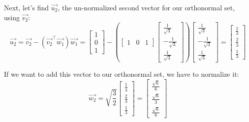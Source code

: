 \begin{enumerate}
{    Next, let's find $\vec{u_2}$, the un-normalized second vector for our orthonormal set, using $\vec{v_2}$:
    \[\vec{u_2} = \vec{v_2} - (\vec{v_2}^{\top}\vec{w_1})\vec{w_1} = \begin{bmatrix}1\\0\\1\end{bmatrix} - (\begin{bmatrix}1 & 0 & 1\end{bmatrix}\begin{bmatrix}\frac{1}{\sqrt{3}}\\-\frac{1}{\sqrt{3}}\\\frac{1}{\sqrt{3}}\end{bmatrix})\begin{bmatrix}\frac{1}{\sqrt{3}}\\-\frac{1}{\sqrt{3}}\\\frac{1}{\sqrt{3}}\end{bmatrix} = \begin{bmatrix}\frac{1}{3}\\\frac{2}{3}\\\frac{1}{3}\end{bmatrix} \]

    If we want to add this vector to our orthonormal set, we have to normalize it:
    \[\vec{w_2} = \sqrt{\frac{3}{2}}\begin{bmatrix}\frac{1}{3}\\\frac{2}{3}\\\frac{1}{3}\end{bmatrix} = \begin{bmatrix}\frac{\sqrt{6}}{6}\\\frac{\sqrt{6}}{3}\\\frac{\sqrt{6}}{6}\end{bmatrix}
    \]

}
\end{enumerate}
